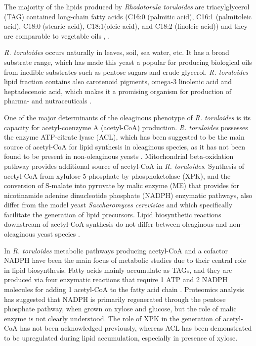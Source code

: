 The majority of the lipids produced by \textit{Rhodotorula toruloides} are
triacylglycerol (TAG) contained long-chain fatty acids (C16:0 
(palmitic acid), C16:1 (palmitoleic acid), C18:0 (stearic acid), C18:1(oleic acid), and C18:2 (linoleic acid)) and they
are comparable to vegetable oils \cite{Li2007}, \cite{Vasconcelos2019}.

\textit{R. toruloides} occurs naturally in leaves, soil, sea water, etc. It has a broad substrate range, 
which has made this yeast a popular for producing biological oils from inedible 
substrates such as pentose sugars and crude glycerol. \cite{Tiukova2019} 
\textit{R. toruloides} lipid fraction contains also carotenoid pigments, 
omega-3 linolenic acid and heptadecenoic acid,
which makes it a promising organism for production of pharma- and nutraceuticals \cite{Buzzini2007}. 

One of the major determinants of the oleaginous phenotype of \textit{R. toruloides} is its capacity for acetyl-coenzyme A (acetyl-CoA) production. 
\textit{R. toruloides} possesses the enzyme ATP-citrate lyase (ACL), 
which has been suggested to be the main source of acetyl-CoA for lipid
synthesis in oleaginous species, as it has not been found to be present in non-oleaginous yeasts \cite{Vorapreeda2012}. Mitochondrial beta-oxidation pathway
provides additional source of acetyl-CoA in \textit{R. toruloides}. \cite{Tiukova2019}
Synthesis of acetyl-CoA from xylulose 5-phosphate by phosphoketolase (XPK), and the conversion of S-malate into pyruvate by 
malic enzyme (ME) that provides for nicotinamide adenine dinucleotide phosphate (NADPH) enzymatic pathways, also differ from the model yeast \textit{Saccharomyces
cerevisiae} and which specifically facilitate the generation of lipid precursors.\cite{Rekena2023}
Lipid biosynthetic reactions downstream of acetyl-CoA synthesis do not differ between oleaginous and non-oleaginous 
yeast species \cite{Tiukova2019}.

In \textit{R. toruloides} metabolic pathways producing acetyl-CoA and a cofactor NADPH
have been the main focus of metabolic studies due to their central role in lipid
biosynthesis. Fatty acids mainly accumulate as TAGs, and they are
produced via four enzymatic reactions that require 1 ATP and 2 NADPH molecules for adding 1 acetyl-CoA to the fatty acid chain \cite{Lian2015}.
Proteomics analysis has suggested that NADPH is primarily regenerated through the pentose phosphate pathway, when grown on xylose 
and glucose, but the role of malic enzyme is not clearly understood. The
role of XPK in the generation of acetyl-CoA has not been acknowledged previously, whereas
ACL has been demonstrated to be upregulated during lipid accumulation, especially in
presence of xylose.\cite{Rekena2023} 



